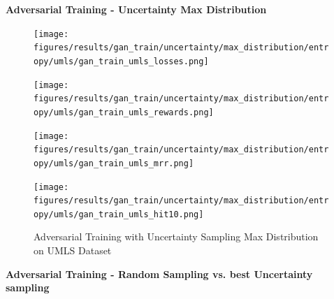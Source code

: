 \textbf{Adversarial Training - Uncertainty Max Distribution}\\
\begin{figure}
    \centering
    \begin{minipage}{.5\textwidth}
      \centering
      \texttt{[image: figures/results/gan\_train/uncertainty/max\_distribution/entropy/umls/gan\_train\_umls\_losses.png]}
    \end{minipage}%
    \begin{minipage}{.5\textwidth}
      \centering
      \texttt{[image: figures/results/gan\_train/uncertainty/max\_distribution/entropy/umls/gan\_train\_umls\_rewards.png]}
    \end{minipage}
    \begin{minipage}{.5\textwidth}
      \centering
      \texttt{[image: figures/results/gan\_train/uncertainty/max\_distribution/entropy/umls/gan\_train\_umls\_mrr.png]}
    \end{minipage}%
    \begin{minipage}{.5\textwidth}
      \centering
      \texttt{[image: figures/results/gan\_train/uncertainty/max\_distribution/entropy/umls/gan\_train\_umls\_hit10.png]}
    \end{minipage}%
    \caption{Adversarial Training with Uncertainty Sampling Max Distribution on \textsc{UMLS} Dataset}
    \label{fig:test}
\end{figure}



\textbf{Adversarial Training - Random Sampling vs. best Uncertainty sampling}\\


